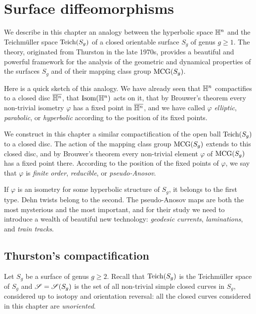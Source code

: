 
\chapter{Surface diffeomorphisms} \label{automorfismi:chapter} \label{automorphisms:chapter}

We describe in this chapter an analogy between the hyperbolic space $\mathbb{H}^n$ and the Teichm\"uller space ${\rm Teich}(S_g)$ of a closed orientable surface $S_g$ of genus $g\geqslant 1$. The theory, originated from Thurston in the late 1970s, provides a beautiful and powerful framework for the analysis of the geometric and dynamical properties of the surfaces $S_g$ and of their mapping class group ${\rm MCG}(S_g)$. %

Here is a quick sketch of this analogy. We have already seen that $\mathbb{H}^n$ compactifies to a closed disc $\overline{\mathbb{H}^n}$, that ${\rm Isom}(\mathbb{H}^n)$ acts on it, that by Brouwer's theorem every non-trivial isometry $\varphi$ has a fixed point in $\overline{\mathbb{H}^n}$, and we have called $\varphi$ \emph{elliptic}, \emph{parabolic}, or \emph{hyperbolic} according to the position of its fixed points.

We construct in this chapter a similar compactification of the open ball ${\rm Teich}(S_g)$ to a closed disc. The action of the mapping class group ${\rm MCG}(S_g)$ extends to this closed disc, and by Brouwer's theorem every non-trivial element $\varphi$ of ${\rm MCG}(S_g)$ has a fixed point there. According to the position of the fixed points of $\varphi$, we say that $\varphi$ is \emph{finite order}, \emph{reducible}, or \emph{pseudo-Anosov}. 

If $\varphi$ is an isometry for some hyperbolic structure of $S_g$, it belongs to the first type. Dehn twists belong to the second. The pseudo-Anosov maps are both the most mysterious and the most important, and for their study we need to introduce a wealth of beautiful new technology: \emph{geodesic currents}, \emph{laminations}, and \emph{train tracks}.

\section{Thurston's compactification}
Let $S_g$ be a surface of genus $g\geqslant 2$.
Recall that ${\rm Teich}(S_g)$ is the Teichm\"uller space of $S_g$ and $\mathscr{S} = \mathscr{S}(S_g)$ is the set of all non-trivial simple closed curves in $S_g$, considered up to isotopy and orientation reversal: all the closed curves considered in this chapter are \emph{unoriented}. 

